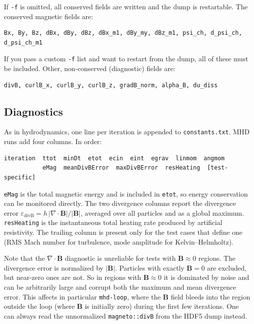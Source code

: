 If \texttt{-f} is omitted, all conserved fields are written and the dump is restartable.
The conserved magnetic fields are:

\begin{verbatim}
Bx, By, Bz, dBx, dBy, dBz, dBx_m1, dBy_my, dBz_m1, psi_ch, d_psi_ch, d_psi_ch_m1
\end{verbatim}

If you pass a custom \texttt{-f} list and want to restart from the dump, all of these must be
included. Other, non-conserved (diagnostic) fields are:

\begin{verbatim}
divB, curlB_x, curlB_y, curlB_z, gradB_norm, alpha_B, du_diss
\end{verbatim}

\subsection{Diagnostics}

As in hydrodynamics, one line per iteration is appended to \texttt{constants.txt}. MHD runs add four columns. In order:

\begin{verbatim}
iteration  ttot  minDt  etot  ecin  eint  egrav  linmom  angmom
           eMag  meanDivBError  maxDivBError  resHeating  [test-specific]
\end{verbatim}

\texttt{eMag} is the total magnetic energy and is included in \texttt{etot}, so energy
conservation can be monitored directly. The two divergence columns report the
divergence error $\varepsilon_\mathrm{divB} = h\,|\nabla\cdot\mathbf{B}|/|\mathbf{B}|$, averaged over all particles and as a global maximum. \texttt{resHeating} is the instantaneous total heating rate produced by artificial resistivity. The trailing column is present only for the test cases that define one (RMS Mach number for turbulence, mode amplitude for Kelvin--Helmholtz).

Note that the $\nabla\cdot\mathbf{B}$ diagnostic is unreliable for tests with $\mathbf{B} \approx 0$ regions. The divergence error is normalized by $|\mathbf{B}|$. Particles with exactly $\mathbf{B} = 0$ are excluded, but near-zero ones are not. So in regions with $\mathbf{B} \approx 0$ it is dominated by noise and can be arbitrarily large and corrupt both the maximum and mean divergence error. This affects in particular \texttt{mhd-loop}, where the $\mathbf{B}$ field bleeds into the region outside the loop (where $\mathbf{B}$ is initially zero) during the first few iterations. One can always read the unnormalized \texttt{magneto::divB} from the HDF5 dump instead.


